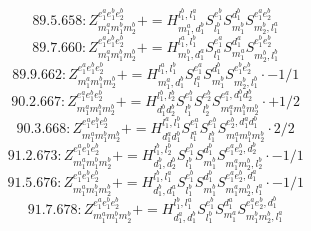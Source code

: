 \documentclass[letterpaper,10pt,fleqn,leqno,onecolumn]{article}
\begin{document}
\begin{equation} \;\;\;\;\;\;  89.5.658: Z^{e_{1}^{a}e_{1}^{b}e_{2}^{b}}_{m_{1}^{a}m_{1}^{b}m_{2}^{b}}+=H^{l_{1}^{b},l_{1}^{a}}_{m_{1}^{a},d_{1}^{b}}S^{e_{1}^{b}}_{l_{1}^{b}}S^{d_{1}^{b}}_{m_{1}^{b}}S^{e_{1}^{a}e_{2}^{b}}_{m_{2}^{b},l_{1}^{a}} \end{equation}
\begin{equation} \;\;\;\;\;\;  89.7.660: Z^{e_{1}^{a}e_{1}^{b}e_{2}^{b}}_{m_{1}^{a}m_{1}^{b}m_{2}^{b}}+=H^{l_{1}^{a},l_{1}^{b}}_{m_{1}^{b},d_{1}^{a}}S^{e_{1}^{a}}_{l_{1}^{a}}S^{d_{1}^{a}}_{m_{1}^{a}}S^{e_{1}^{b}e_{2}^{b}}_{m_{2}^{b},l_{1}^{b}} \end{equation}
\begin{equation} \;\;\;\;\;\;  89.9.662: Z^{e_{1}^{a}e_{1}^{b}e_{2}^{b}}_{m_{1}^{a}m_{1}^{b}m_{2}^{b}}+=H^{l_{1}^{a},l_{1}^{b}}_{m_{1}^{a},d_{1}^{b}}S^{e_{1}^{a}}_{l_{1}^{a}}S^{d_{1}^{b}}_{m_{1}^{b}}S^{e_{1}^{b}e_{2}^{b}}_{m_{2}^{b},l_{1}^{b}}\cdot -1/1 \end{equation}
\begin{equation} \;\;\;\;\;\;  90.2.667: Z^{e_{1}^{a}e_{1}^{b}e_{2}^{b}}_{m_{1}^{a}m_{1}^{b}m_{2}^{b}}+=H^{l_{1}^{b},l_{2}^{b}}_{d_{1}^{b}d_{2}^{b}}S^{e_{1}^{b}}_{l_{1}^{b}}S^{e_{2}^{b}}_{l_{2}^{b}}S^{e_{1}^{a},d_{1}^{b}d_{2}^{b}}_{m_{1}^{a}m_{1}^{b}m_{2}^{b}}\cdot +1/2 \end{equation}
\begin{equation} \;\;\;\;\;\;  90.3.668: Z^{e_{1}^{a}e_{1}^{b}e_{2}^{b}}_{m_{1}^{a}m_{1}^{b}m_{2}^{b}}+=H^{l_{1}^{a},l_{1}^{b}}_{d_{1}^{a}d_{1}^{b}}S^{e_{1}^{a}}_{l_{1}^{a}}S^{e_{1}^{b}}_{l_{1}^{b}}S^{e_{2}^{b},d_{1}^{a}d_{1}^{b}}_{m_{1}^{a}m_{1}^{b}m_{2}^{b}}\cdot 2/2 \end{equation}
\begin{equation} \;\;\;\;\;\;  91.2.673: Z^{e_{1}^{a}e_{1}^{b}e_{2}^{b}}_{m_{1}^{a}m_{1}^{b}m_{2}^{b}}+=H^{l_{1}^{b},l_{2}^{b}}_{d_{1}^{b},d_{2}^{b}}S^{e_{1}^{b}}_{l_{1}^{b}}S^{d_{1}^{b}}_{m_{1}^{b}}S^{e_{1}^{a}e_{2}^{b},d_{2}^{b}}_{m_{1}^{a}m_{2}^{b},l_{2}^{b}}\cdot -1/1 \end{equation}
\begin{equation} \;\;\;\;\;\;  91.5.676: Z^{e_{1}^{a}e_{1}^{b}e_{2}^{b}}_{m_{1}^{a}m_{1}^{b}m_{2}^{b}}+=H^{l_{1}^{b},l_{1}^{a}}_{d_{1}^{b},d_{1}^{a}}S^{e_{1}^{b}}_{l_{1}^{b}}S^{d_{1}^{b}}_{m_{1}^{b}}S^{e_{1}^{a}e_{2}^{b},d_{1}^{a}}_{m_{1}^{a}m_{2}^{b},l_{1}^{a}}\cdot -1/1 \end{equation}
\begin{equation} \;\;\;\;\;\;  91.7.678: Z^{e_{1}^{a}e_{1}^{b}e_{2}^{b}}_{m_{1}^{a}m_{1}^{b}m_{2}^{b}}+=H^{l_{1}^{b},l_{1}^{a}}_{d_{1}^{a},d_{1}^{b}}S^{e_{1}^{b}}_{l_{1}^{b}}S^{d_{1}^{a}}_{m_{1}^{a}}S^{e_{1}^{a}e_{2}^{b},d_{1}^{b}}_{m_{1}^{b}m_{2}^{b},l_{1}^{a}} \end{equation}
\end{document}
